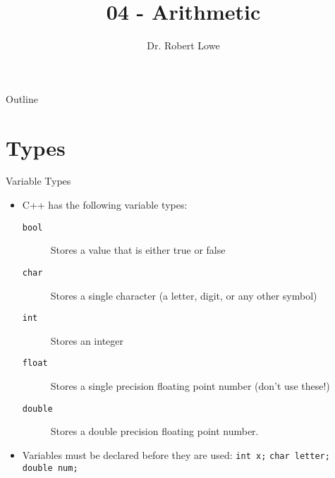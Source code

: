 \documentclass[]{beamer}
\title{04 - Arithmetic}
\author{Dr. Robert Lowe\\}
\institute[Maryville College] %
{
  Division of Mathematics and Computer Science\\
  Maryville College
}
\date[]{}
\begin{document}
\begin{frame}
  \titlepage
\end{frame}

\begin{frame}{Outline}
  \tableofcontents
\end{frame}





\section{Types}

\begin{frame}{Variable Types}
    \begin{itemize}
        \item C++ has the following variable types:
            \begin{description}
                \item[\texttt{bool}] Stores a value that is either true or
                    false
                \item[\texttt{char}] Stores a single character (a letter,
                    digit, or any other symbol)
                \item[\texttt{int}] Stores an integer
                \item[\texttt{float}] Stores a single precision floating point
                    number (don't use these!)
                \item[\texttt{double}] Stores a double precision floating point 
                    number.
            \end{description}
        \item Variables must be declared before they are used:
            \newline\texttt{int x;}
            \newline\texttt{char letter;}
            \newline\texttt{double num;}
    \end{itemize}
\end{frame}
\end{document}
